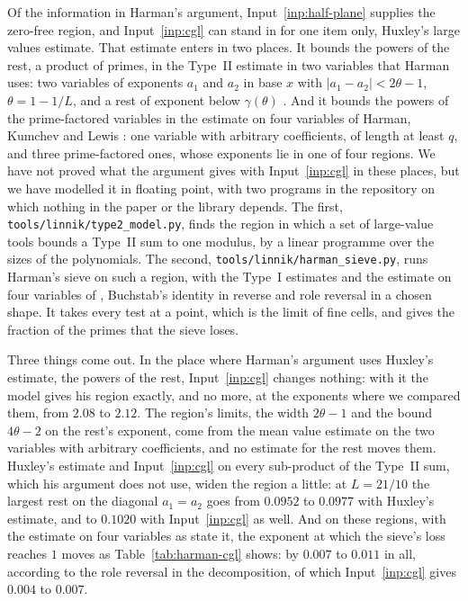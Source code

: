 \documentclass[11pt]{article}
\theoremstyle{definition}
\newcommand{\file}[1]{\nolinkurl{#1}}
\begin{document}
Of the information in Harman's argument, Input~\ref{inp:half-plane} supplies the zero-free region, and
Input~\ref{inp:cgl} can stand in for one item only, Huxley's large values estimate. That estimate enters in two places.
It bounds the powers of the rest, a product of primes, in the Type~II estimate in two variables that Harman uses: two
variables of exponents $a_1$ and $a_2$ in base $x$ with $|a_1 - a_2| < 2\theta - 1$, $\theta = 1 - 1/L$, and a rest
of exponent below $\gamma(\theta)$ \cite[p.~646]{harman05}. And it bounds the powers of the prime-factored variables
in the estimate on four variables of Harman, Kumchev and Lewis \cite{hkl}: one variable with arbitrary coefficients,
of length at least $q$, and three prime-factored ones, whose exponents lie in one of four regions. We have not proved
what the argument gives with Input~\ref{inp:cgl} in these places, but we have modelled it in floating point, with two
programs in the repository on which nothing in the paper or the library depends. The first,
\file{tools/linnik/type2\_model.py}, finds the region in which a set of large-value tools bounds a Type~II sum to one
modulus, by a linear programme over the sizes of the polynomials. The second, \file{tools/linnik/harman\_sieve.py},
runs Harman's sieve on such a region, with the Type~I estimates and the estimate on four variables of \cite{hkl},
Buchstab's identity in reverse and role reversal in a chosen shape. It takes every test at a point, which is the limit
of fine cells, and gives the fraction of the primes that the sieve loses.

Three things come out. In the place where Harman's argument uses Huxley's estimate, the powers of the rest,
Input~\ref{inp:cgl} changes nothing: with it the model gives his region exactly, and no more, at the exponents where
we compared them, from $2.08$ to $2.12$. The region's limits, the width $2\theta - 1$ and the bound $4\theta - 2$
on the rest's exponent, come from the mean value estimate on the two variables with arbitrary coefficients, and no
estimate for the rest moves them. Huxley's estimate and
Input~\ref{inp:cgl} on every sub-product of the Type~II sum, which his argument does not use, widen the region a
little: at $L = 21/10$ the largest rest on the diagonal $a_1 = a_2$ goes from $0.0952$ to $0.0977$ with Huxley's
estimate, and to $0.1020$ with Input~\ref{inp:cgl} as well. And on these regions, with the estimate on four
variables as \cite{hkl} state it, the exponent at which the sieve's loss reaches $1$ moves as
Table~\ref{tab:harman-cgl} shows: by $0.007$ to $0.011$ in all, according to the role reversal in the decomposition,
of which Input~\ref{inp:cgl} gives $0.004$ to $0.007$.
\end{document}
